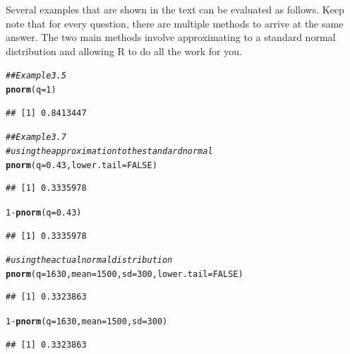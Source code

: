 \documentclass{report}\usepackage[]{graphicx}\usepackage[]{color}
\makeatletter
\newcommand{\hlnum}[1]{\textcolor[rgb]{0.686,0.059,0.569}{#1}}%
\newcommand{\hlcom}[1]{\textcolor[rgb]{0.678,0.584,0.686}{\textit{#1}}}%
\newcommand{\hlopt}[1]{\textcolor[rgb]{0,0,0}{#1}}%
\newcommand{\hlstd}[1]{\textcolor[rgb]{0.345,0.345,0.345}{#1}}%
\newcommand{\hlkwc}[1]{\textcolor[rgb]{0.333,0.667,0.333}{#1}}%
\newcommand{\hlkwd}[1]{\textcolor[rgb]{0.737,0.353,0.396}{\textbf{#1}}}%
\newenvironment{kframe}{%
 \def\at@end@of@kframe{}%
 \ifinner\ifhmode%
  \def\at@end@of@kframe{\end{minipage}}%
  \begin{minipage}{\columnwidth}%
 \fi\fi%
 \def\FrameCommand##1{\hskip\@totalleftmargin \hskip-\fboxsep
 \colorbox{shadecolor}{##1}\hskip-\fboxsep
     \hskip-\linewidth \hskip-\@totalleftmargin \hskip\columnwidth}%
 \MakeFramed {\advance\hsize-\width
   \@totalleftmargin\z@ \linewidth\hsize
   \@setminipage}}%
 {\par\unskip\endMakeFramed%
 \at@end@of@kframe}
\newenvironment{knitrout}{}{} %
\makeatother
\begin{document}
\vspace{.75cm}
Several examples that are shown in the text can be evaluated as follows.  Keep note that for every question, there are multiple methods to arrive at the same answer.  The two main methods involve approximating to a standard normal distribution and allowing R to do all the work for you.  
\begin{knitrout}
\color{fgcolor}\begin{kframe}
\begin{alltt}
\hlcom{## Example 3.5}
\hlkwd{pnorm}\hlstd{(}\hlkwc{q} \hlstd{=} \hlnum{1}\hlstd{)}
\end{alltt}
\begin{verbatim}
## [1] 0.8413447
\end{verbatim}
\end{kframe}
\end{knitrout}

\begin{knitrout}
\color{fgcolor}\begin{kframe}
\begin{alltt}
\hlcom{## Example 3.7 }
\hlcom{# using the approximation to the standard normal }
\hlkwd{pnorm}\hlstd{(}\hlkwc{q} \hlstd{=} \hlnum{0.43}\hlstd{,} \hlkwc{lower.tail} \hlstd{=} \hlnum{FALSE}\hlstd{)}
\end{alltt}
\begin{verbatim}
## [1] 0.3335978
\end{verbatim}
\begin{alltt}
\hlnum{1} \hlopt{-} \hlkwd{pnorm}\hlstd{(}\hlkwc{q} \hlstd{=} \hlnum{0.43}\hlstd{)}
\end{alltt}
\begin{verbatim}
## [1] 0.3335978
\end{verbatim}
\begin{alltt}
\hlcom{# using the actual normal distribution }
\hlkwd{pnorm}\hlstd{(}\hlkwc{q} \hlstd{=} \hlnum{1630}\hlstd{,} \hlkwc{mean} \hlstd{=} \hlnum{1500}\hlstd{,} \hlkwc{sd} \hlstd{=} \hlnum{300}\hlstd{,} \hlkwc{lower.tail} \hlstd{=} \hlnum{FALSE}\hlstd{)}
\end{alltt}
\begin{verbatim}
## [1] 0.3323863
\end{verbatim}
\begin{alltt}
\hlnum{1} \hlopt{-} \hlkwd{pnorm}\hlstd{(}\hlkwc{q} \hlstd{=} \hlnum{1630}\hlstd{,} \hlkwc{mean} \hlstd{=} \hlnum{1500}\hlstd{,} \hlkwc{sd} \hlstd{=} \hlnum{300}\hlstd{)}
\end{alltt}
\begin{verbatim}
## [1] 0.3323863
\end{verbatim}
\end{kframe}
\end{knitrout}
\end{document}
